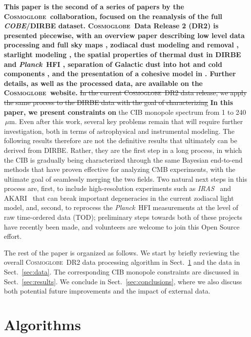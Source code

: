 \documentclass{aa}
\def\Planck{\textit{Planck}}
\newcommand{\cosmoglobe}{\textsc{Cosmoglobe}}
\def\Planck{\textit{Planck}}
\def\COBE{\textit{COBE}}
\def\AKARI{\textrm{{AKARI}}}
\def\IRAS{\textit{{IRAS}}}
\begin{document}
\textbf{
	This paper is the second of a series of papers by the \cosmoglobe\ collaboration, focused on the reanalysis of the full \COBE/DIRBE dataset. \cosmoglobe\ Data Release 2 (DR2) is presented piecewise, with an overview paper describing low level data processing and full sky maps \citep{CG02_01}, zodiacal dust modeling and removal \citep{CG02_02}, starlight modeling \citep{CG02_04}, the spatial properties of thermal dust in DIRBE and \Planck\ HFI \citep{CG02_05}, separation of Galactic dust into hot and cold components \citep{CG02_06}, and the presentation of a cohesive model in \citep{CG02_07}. Further details, as well as the processed data, are available on the \cosmoglobe\ website.
}
\sout{In the current \cosmoglobe\ DR2 data release, we apply the same process to the DIRBE data with the goal of characterizing}
\textbf{In this paper, we present constraints on}
the CIB monopole spectrum from 1 to 240$\,\mu\mathrm{m}$. Even after this work, several key problems remain that will require further investigation, both in terms of astrophysical and instrumental modeling. The following results therefore are not the definitive results that ultimately can be derived from DIRBE. Rather, they are the first step in a long process, in which the CIB is gradually being characterized through the same Bayesian end-to-end methods that have proven effective for analyzing CMB experiments, with the ultimate goal of seamlessly merging the two fields. Two natural next steps in this process are, first, to include high-resolution experiments such as \IRAS\ \citep{neugebauer:1984} and \AKARI\ \citep{murakami:2007} that can break important degeneracies in the current zodiacal light model, and, second, to reprocess the \Planck\ HFI measurements at the level of raw time-ordered data (TOD); preliminary steps towards both of these projects have recently been made, and volunteers are welcome to join this Open Source effort.


The rest of the paper is organized as follows.
We start by briefly reviewing the overall \cosmoglobe\ DR2 data processing algorithm in Sect.~\ref{sec:algorithm} and the data in Sect.~\ref{sec:data}. The corresponding CIB monopole constraints are discussed in Sect.~\ref{sec:results}. We conclude in Sect.~\ref{sec:conclusions}, where we also discuss both potential future improvements and the impact of external data.




\section{Algorithms}
\label{sec:algorithm}
\end{document}
